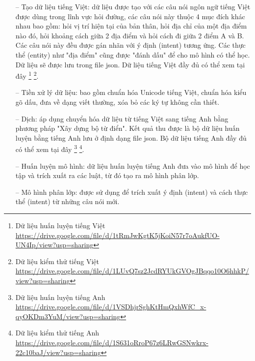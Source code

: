 \begin{itemize}

    \item[--]Tạo dữ liệu tiếng Việt: dữ liệu được tạo với các câu nói ngôn ngữ tiếng Việt được dùng trong lĩnh vực hỏi đường, các câu nói này thuộc 4 mục đích khác nhau bao gồm: hỏi vị trí hiện tại của bản thân, hỏi địa chỉ của một địa điểm nào đó, hỏi khoảng cách giữa 2 địa điểm và hỏi cách đi giữa 2 điểm A và B. Các câu nói này đều được gán nhãn với ý định (intent) tương ứng. Các thực thể (entity) như "địa điểm" cũng được "đánh dấu" để cho mô hình có thể học. Dữ liệu sẽ được lưu trong file json. Dữ liệu tiếng Việt đầy đủ có thể xem tại đây \footnote{Dữ liệu huấn luyện tiếng Việt \url{https://drive.google.com/file/d/1tRmJwKgtK5jKoiN57r7oAukfUO-UN4Ip/view?usp=sharing}}
    \footnote{Dữ liệu kiểm thử tiếng Việt \url{https://drive.google.com/file/d/1LUvQ7sz2JcdRYUkGVOgJBqqo10O6hhkP/view?usp=sharing}}.

\item[--]Tiền xử lý dữ liệu: bao gồm chuẩn hóa Unicode tiếng Việt, chuẩn hóa kiểu gõ dấu, đưa về dạng viết thường, xóa bỏ các ký tự không cần thiết.

\item[--]Dịch: áp dụng chuyển hóa dữ liệu từ tiếng Việt sang tiếng Anh bằng phương pháp "Xây dựng bộ từ điển". Kết quả thu được là bộ dữ liệu huấn luyện bằng tiếng Anh lưu ở định dạng file json. Bộ dữ liệu tiếng Anh đầy đủ có thể xem tại đây \footnote{Dữ liệu huấn luyện tiếng Anh \url{https://drive.google.com/file/d/1VSDhjrSghKtHmQxhWfC_x-qyOKDm3YuM/view?usp=sharing}}
    \footnote{Dữ liệu kiểm thử tiếng Anh \url{https://drive.google.com/file/d/1S631oRroP67z6LRwGSNwkrx-22c10baJ/view?usp=sharing}}.

\item[--]Huấn luyện mô hình: dữ liệu huấn luyện tiếng Anh đưa vào mô hình để học tập và trích xuất ra các luật, từ đó tạo ra mô hình phân lớp.
\item[--]Mô hình phân lớp: được sử dụng để trích xuất ý định (intent) và cách thực thể (intent) từ những câu nói mới.
\end{itemize}



